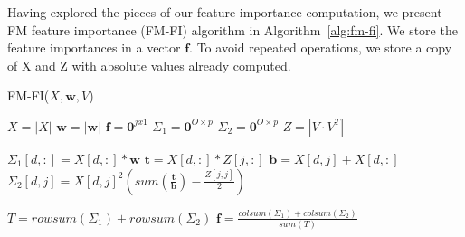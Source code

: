 \documentclass[10pt]{journal}
\begin{document}
Having explored the pieces of our feature importance computation, we present FM
feature importance (FM-FI) algorithm in Algorithm~\ref{alg:fm-fi}. We store the
feature importances in a vector $\bm{f}$. To avoid repeated operations, we store
a copy of X and Z with absolute values already computed.

\begin{algorithm}
    \caption{FM-FI($X, \bm{w}, V$)}
    \label{alg:fm-fi}
    \begin{algorithmic}[1]
        \State $X = |X|$  
        \State $\bm{w} = |\bm{w}|$
        \State $\bm{f} = \bm{0}^{j x 1}$
        \State $\Sigma_1 = \bm{0}^{O \times p}$
        \State $\Sigma_2 = \bm{0}^{O \times p}$
        \State $Z = |V \cdot V^T|$  
        \item[]
          
            \State $\Sigma_1[d,:] = X[d,:] * \bm{w}$
                \State $\bm{t} = X[d,:] * Z[j,:]$
                \State $\bm{b} = X[d,j] + X[d,:]$
                \State $\Sigma_2[d,j] = X[d,j]^2
                    (sum(\frac{\bm{t}}{\bm{b}}) - \frac{Z[j,j]}{2})$
            \EndFor
        \EndFor
        \item[]
        \State $T = rowsum(\Sigma_1) + rowsum(\Sigma_2)$
        \State $\bm{f} = \frac{colsum(\Sigma_1) + colsum(\Sigma_2)}{sum(T)}$

    \end{algorithmic}
\end{algorithm}




\end{document}
